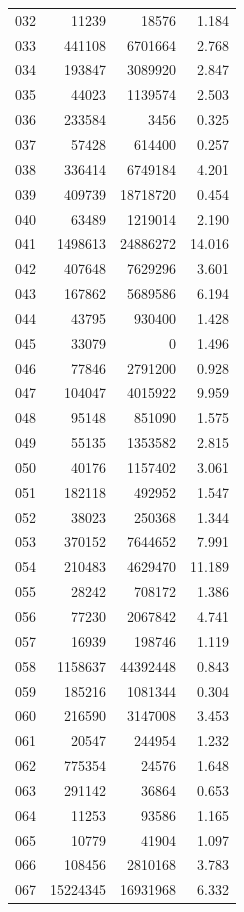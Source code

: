 \documentclass[anonymous,notoc]{gmcm2026}
\begin{document}
\begin{longtable}{lrrr}
032 & 11239 & 18576 & 1.184 \\
033 & 441108 & 6701664 & 2.768 \\
034 & 193847 & 3089920 & 2.847 \\
035 & 44023 & 1139574 & 2.503 \\
036 & 233584 & 3456 & 0.325 \\
037 & 57428 & 614400 & 0.257 \\
038 & 336414 & 6749184 & 4.201 \\
039 & 409739 & 18718720 & 0.454 \\
040 & 63489 & 1219014 & 2.190 \\
041 & 1498613 & 24886272 & 14.016 \\
042 & 407648 & 7629296 & 3.601 \\
043 & 167862 & 5689586 & 6.194 \\
044 & 43795 & 930400 & 1.428 \\
045 & 33079 & 0 & 1.496 \\
046 & 77846 & 2791200 & 0.928 \\
047 & 104047 & 4015922 & 9.959 \\
048 & 95148 & 851090 & 1.575 \\
049 & 55135 & 1353582 & 2.815 \\
050 & 40176 & 1157402 & 3.061 \\
051 & 182118 & 492952 & 1.547 \\
052 & 38023 & 250368 & 1.344 \\
053 & 370152 & 7644652 & 7.991 \\
054 & 210483 & 4629470 & 11.189 \\
055 & 28242 & 708172 & 1.386 \\
056 & 77230 & 2067842 & 4.741 \\
057 & 16939 & 198746 & 1.119 \\
058 & 1158637 & 44392448 & 0.843 \\
059 & 185216 & 1081344 & 0.304 \\
060 & 216590 & 3147008 & 3.453 \\
061 & 20547 & 244954 & 1.232 \\
062 & 775354 & 24576 & 1.648 \\
063 & 291142 & 36864 & 0.653 \\
064 & 11253 & 93586 & 1.165 \\
065 & 10779 & 41904 & 1.097 \\
066 & 108456 & 2810168 & 3.783 \\
067 & 15224345 & 16931968 & 6.332 \\

\end{longtable}
\end{document}
